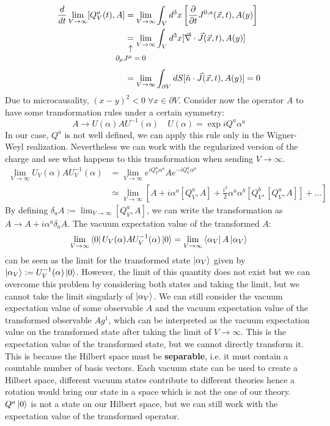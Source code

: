 \documentclass[../main.tex]{subfiles}
\begin{document}
\begin{align*}
\frac{d}{dt}\lim_{V\to\infty}[Q_V^a(t),A]&=\lim_{V\to\infty}\int_Vd^3x\left[\frac{\partial}{\partial t}J^{0,a}(\Vec{x},t),A(y)\right]\\
&\underset{\mathclap{\tikz \node {$\uparrow$} node [below=1ex] {\footnotesize $\partial_\mu J^\mu=0$ };}}{=}\lim_{V\to\infty}\int_Vd^3x[\Vec{\nabla}\cdot\Vec{J}(\Vec{x},t),A(y)]\\
&=\lim_{V\to\infty}\int_{\partial V}dS[\hat{n}\cdot\Vec{J}(\Vec{x},t),A(y)]=0
\end{align*}
Due to microcausality, $(x-y)^2<0\;\forall x\in\partial V$. Consider now the operator $A$ to have some transformation rules under a certain symmetry:
\[
A\to U(\alpha)AU^{-1}(\alpha) \quad U(\alpha)=\exp{iQ^a\alpha^a}
\]
In our case, $Q^a$ is not well defined, we can apply this rule only in the Wigner-Weyl realization. Nevertheless we can work with the regularized version of the charge and see what happens to this transformation when sending $V\to\infty$.
\begin{align*}
\lim_{V\to\infty}U_V(\alpha)AU^{-1}_V(\alpha)&=\lim_{V\to\infty}e^{iQ_V^a\alpha^a}Ae^{-iQ_V^a\alpha^a}\\
&\simeq\lim_{V\to\infty}\left[A+i\alpha^a[Q_V^a,A]+\frac{i^2}{2}\alpha^a\alpha^b[Q_V^b,[Q_V^a,A]]+\dots\right]
\end{align*}
By defining $\delta_aA:=\lim_{V\to\infty}[Q_V^a,A]$, we can write the transformation as $A\to A+i\alpha^a\delta_aA$. The vacuum expectation value of the transformed $A$:
\[
\lim_{V\to\infty}\bra{0}U_V(\alpha)AU_V^{-1}(\alpha)\ket{0}=\lim_{V\to\infty}\bra{\alpha_V}A\ket{\alpha_V}
\]
can be seen as the limit for the transformed state $\ket{\alpha_V}$ given by\\ $\ket{\alpha_V}:=U_V^{-1}(\alpha)\ket{0}$. However, the limit of this quantity does not exist but we can overcome this problem by considering both states and taking the limit, but we cannot take the limit singularly of $\ket{\alpha_V}$. We can still consider the vacuum expectation value of some observable $A$ and the vacuum expectation value of the transformed observable $Ag^{1}$, which can be interpreted as the vacuum expectation value on the transformed state after taking the limit of $V\to\infty$. This is the expectation value of the transformed state, but we cannot directly transform it. This is because the Hilbert space must be \textbf{separable}, i.e. it must contain a countable number of basis vectors. Each vacuum state can be used to create a Hilbert space, different vacuum states contribute to different theories hence a rotation would bring our state in a space which is not the one of our theory. $Q^a\ket{0}$ is not a state on our Hilbert space, but we can still work with the expectation value of the transformed operator.
\end{document}
